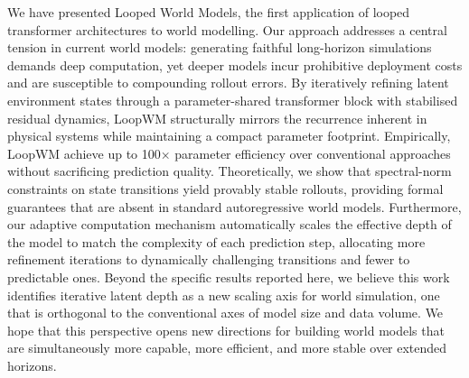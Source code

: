 We have presented Looped World Models, the first application of looped transformer architectures to world modelling. Our approach addresses a central tension in current world models: generating faithful long-horizon simulations demands deep computation, yet deeper models incur prohibitive deployment costs and are susceptible to compounding rollout errors. By iteratively refining latent environment states through a parameter-shared transformer block with stabilised residual dynamics, LoopWM structurally mirrors the recurrence inherent in physical systems while maintaining a compact parameter footprint. Empirically, LoopWM achieve up to 100× parameter efficiency over conventional approaches without sacrificing prediction quality. Theoretically, we show that spectral-norm constraints on state transitions yield provably stable rollouts, providing formal guarantees that are absent in standard autoregressive world models. Furthermore, our adaptive computation mechanism automatically scales the effective depth of the model to match the complexity of each prediction step, allocating more refinement iterations to dynamically challenging transitions and fewer to predictable ones. Beyond the specific results reported here, we believe this work identifies iterative latent depth as a new scaling axis for world simulation, one that is orthogonal to the conventional axes of model size and data volume. We hope that this perspective opens new directions for building world models that are simultaneously more capable, more efficient, and more stable over extended horizons.

